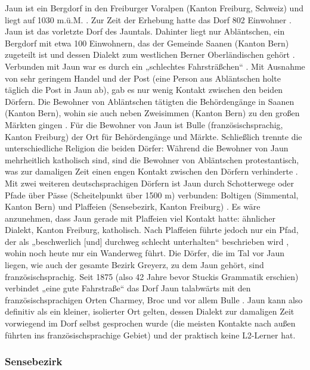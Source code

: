 Jaun ist ein Bergdorf in den Freiburger Voralpen (Kanton Freiburg, Schweiz) und liegt auf 1030 m.ü.M. \citep[1]{Stucki1917}. Zur Zeit der Erhebung hatte das Dorf 802 Einwohner \citep[10]{Stucki1917}. Jaun ist das vorletzte Dorf des Jauntals. Dahinter liegt nur Abläntschen, ein Bergdorf mit etwa 100 Einwohnern, das der Gemeinde Saanen (Kanton Bern) zugeteilt ist und dessen Dialekt zum westlichen Berner Oberländischen gehört \citep[2--3]{Stucki1917}. Verbunden mit Jaun war es durch ein „schlechtes Fahrsträßchen“ \citep[2]{Stucki1917}. Mit Ausnahme von sehr geringem Handel und der Post (eine Person aus Abläntschen holte täglich die Post in Jaun ab), gab es nur wenig Kontakt zwischen den beiden Dörfern. Die Bewohner von Abläntschen tätigten die Behördengänge in Saanen (Kanton Bern), wohin sie auch neben Zweisimmen (Kanton Bern) zu den großen Märkten gingen \citep[3]{Stucki1917}. Für die Bewohner von Jaun ist Bulle (französischsprachig, Kanton Freiburg) \citep[1]{Stucki1917} der Ort für Behördengänge und Märkte. Schließlich trennte die unterschiedliche Religion die beiden Dörfer: Während die Bewohner von Jaun mehrheitlich katholisch sind, sind die Bewohner von Abläntschen protestantisch, was zur damaligen Zeit einen engen Kontakt zwischen den Dörfern verhinderte \citep[3 ,9]{Stucki1917}. Mit zwei weiteren deutschsprachigen Dörfern ist Jaun durch Schotterwege oder Pfade über Pässe (Scheitelpunkt über 1500 m) verbunden: Boltigen (Simmental, Kanton Bern) und Plaffeien (Sensebezirk, Kanton Freiburg) \citep[2--3]{Stucki1917}. Es wäre anzunehmen, dass Jaun gerade mit Plaffeien viel Kontakt hatte: ähnlicher Dialekt, Kanton Freiburg, katholisch. Nach Plaffeien führte jedoch nur ein Pfad, der als „beschwerlich [und] durchweg schlecht unterhalten“ beschrieben wird \citep[3]{Stucki1917}, wohin noch heute nur ein Wanderweg führt. Die Dörfer, die im Tal vor Jaun liegen, wie auch der gesamte Bezirk Greyerz, zu dem Jaun gehört, sind französischsprachig. Seit 1875 (also 42 Jahre bevor Stuckis Grammatik erschien) verbindet „eine gute Fahrstraße“ das Dorf Jaun talabwärts mit den französischsprachigen Orten Charmey, Broc und vor allem Bulle \citep[1]{Stucki1917}. Jaun kann also definitiv als ein kleiner, isolierter Ort gelten, dessen Dialekt zur damaligen Zeit vorwiegend im Dorf selbst gesprochen wurde (die meisten Kontakte nach außen führten ins französischsprachige Gebiet) und der praktisch keine L2-Ler\-ner hat.

\subsubsection{Sensebezirk}\largerpage

